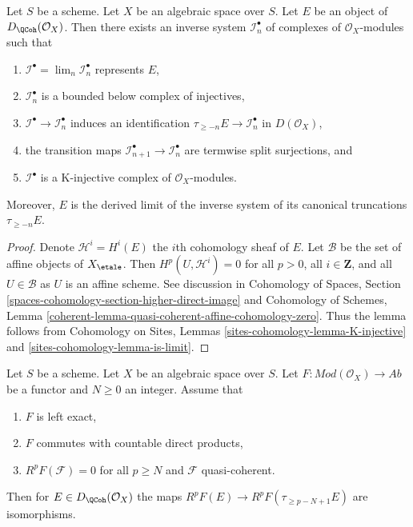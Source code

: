 \begin{lemma}
\label{lemma-nice-K-injective}
Let $S$ be a scheme. Let $X$ be an algebraic space over $S$. Let $E$ be an
object of $D_\QCoh(\mathcal{O}_X)$. Then there exists an inverse
system $\mathcal{I}_n^\bullet$ of complexes of $\mathcal{O}_X$-modules
such that
\begin{enumerate}
\item $\mathcal{I}^\bullet = \lim_n \mathcal{I}_n^\bullet$ represents $E$,
\item $\mathcal{I}_n^\bullet$ is a bounded below complex of injectives,
\item $\mathcal{I}^\bullet \to \mathcal{I}_n^\bullet$ induces an
identification $\tau_{\geq -n}E \to \mathcal{I}_n^\bullet$
in $D(\mathcal{O}_X)$,
\item the transition maps
$\mathcal{I}_{n + 1}^\bullet \to \mathcal{I}_n^\bullet$
are termwise split surjections, and
\item $\mathcal{I}^\bullet$ is a K-injective complex of
$\mathcal{O}_X$-modules.
\end{enumerate}
Moreover, $E$ is the derived limit of the inverse system of
its canonical truncations $\tau_{\geq -n}E$.
\end{lemma}

\begin{proof}
Denote $\mathcal{H}^i = H^i(E)$ the $i$th cohomology sheaf of $E$.
Let $\mathcal{B}$ be the set of affine objects of $X_\etale$.
Then $H^p(U, \mathcal{H}^i) = 0$ for all $p > 0$, all $i \in \mathbf{Z}$,
and all $U \in \mathcal{B}$ as $U$ is an affine scheme.
See discussion in
Cohomology of Spaces, Section
\ref{spaces-cohomology-section-higher-direct-image}
and
Cohomology of Schemes, Lemma
\ref{coherent-lemma-quasi-coherent-affine-cohomology-zero}.
Thus the lemma follows from
Cohomology on Sites, Lemmas \ref{sites-cohomology-lemma-K-injective} and
\ref{sites-cohomology-lemma-is-limit}.
\end{proof}

\begin{lemma}
\label{lemma-application-nice-K-injective}
Let $S$ be a scheme. Let $X$ be an algebraic space over $S$.
Let $F : \textit{Mod}(\mathcal{O}_X) \to \textit{Ab}$
be a functor and $N \geq 0$ an integer. Assume that
\begin{enumerate}
\item $F$ is left exact,
\item $F$ commutes with countable direct products,
\item $R^pF(\mathcal{F}) = 0$ for all $p \geq N$ and $\mathcal{F}$
quasi-coherent.
\end{enumerate}
Then for $E \in D_\QCoh(\mathcal{O}_X)$ the maps
$R^pF(E) \to R^pF(\tau_{\geq p - N + 1}E)$ are isomorphisms.
\end{lemma}

